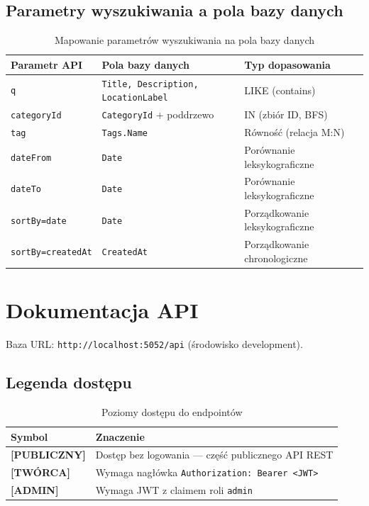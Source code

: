 \documentclass[12pt, a4paper]{article}
\begin{document}
\subsection{Parametry wyszukiwania a pola bazy danych}

\begin{table}[H]
  \centering
  \caption{Mapowanie parametrów wyszukiwania na pola bazy danych}
  \begin{tabular}{@{}L{3.5cm}L{4.5cm}L{5.5cm}@{}}
    \toprule
    \textbf{Parametr API} & \textbf{Pola bazy danych} & \textbf{Typ dopasowania} \\
    \midrule
    \texttt{q}           & \texttt{Title, Description, LocationLabel} & LIKE (contains) \\
    \texttt{categoryId}  & \texttt{CategoryId} + poddrzewo             & IN (zbiór ID, BFS) \\
    \texttt{tag}         & \texttt{Tags.Name}                          & Równość (relacja M:N) \\
    \texttt{dateFrom}    & \texttt{Date}                               & Porównanie leksykograficzne \\
    \texttt{dateTo}      & \texttt{Date}                               & Porównanie leksykograficzne \\
    \texttt{sortBy=date} & \texttt{Date}                               & Porządkowanie leksykograficzne \\
    \texttt{sortBy=createdAt} & \texttt{CreatedAt}                     & Porządkowanie chronologiczne \\
    \bottomrule
  \end{tabular}
\end{table}

\section{Dokumentacja API}

Baza URL: \texttt{http://localhost:5052/api} (środowisko development).

\subsection{Legenda dostępu}

\begin{table}[H]
  \centering
  \caption{Poziomy dostępu do endpointów}
  \begin{tabular}{@{}L{3.5cm}L{10cm}@{}}
    \toprule
    \textbf{Symbol} & \textbf{Znaczenie} \\
    \midrule
    \textbf{[PUBLICZNY]} & Dostęp bez logowania — część publicznego API REST \\
    \textbf{[TWÓRCA]}    & Wymaga nagłówka \texttt{Authorization: Bearer <JWT>} \\
    \textbf{[ADMIN]}     & Wymaga JWT z claimem roli \texttt{admin} \\
    \bottomrule
  \end{tabular}
\end{table}
\end{document}
